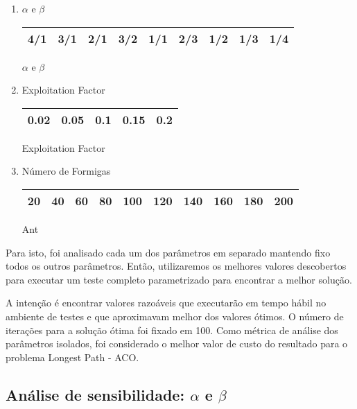 \documentclass{article}
\begin{document}
\begin{enumerate}
  \item $\alpha$ e $\beta$
  \begin{center}
	\par
    \begin{tabular}{| l | l | l | l | l | l | l | l | l |}
    \hline
    4/1 &
    3/1 &
    2/1 &
    3/2 &
    1/1 &
    2/3 &
    1/2 &
    1/3 &
    1/4 \\ \hline
    \end{tabular}
    \newline
    $\alpha$ e $\beta$
\end{center}
  \item Exploitation Factor
    \begin{center}
    \begin{tabular}{| l | l | l | l | l |}
    \hline
    0.02 &
    0.05 &
    0.1 &
    0.15 &
    0.2 
     \\ \hline
    \end{tabular}\newline
Exploitation Factor
\end{center}
  \item Número de Formigas
  \begin{center}
    \begin{tabular}{| l | l | l | l | l | l | l | l | l | l |}
    \hline
    20 &
    40 &
    60 &
    80 &
    100 &  
    120 &  
    140 &  
    160 &  
    180 &  
    200
     \\ \hline
    \end{tabular}\newline
    Ant\end{center}
    
\end{enumerate}

 Para isto, foi analisado cada um dos parâmetros em separado mantendo fixo todos os outros parâmetros. Então, utilizaremos os melhores valores descobertos para executar um teste completo parametrizado para encontrar a melhor solução. 
\newline \par
A intenção é encontrar valores razoáveis que  executarão em tempo hábil no ambiente de testes e que aproximavam melhor dos valores ótimos. O número de iterações para a solução ótima foi fixado em 100. Como métrica de análise dos parâmetros isolados, foi considerado o melhor valor de custo do resultado para o problema Longest Path - ACO.

\subsection{Análise de sensibilidade: $\alpha$ e $\beta$} 
\end{document}
